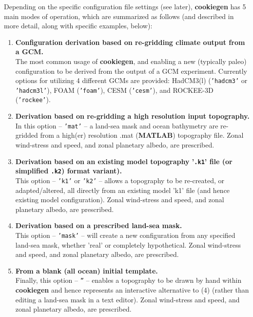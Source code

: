 Depending on the specific configuration file settings (see later), \textbf{cookiegen} has 5 main modes of operation, which are summarized as follows (and described in more detail, along with specific examples, below):

\begin{enumerate}[noitemsep]
\setlength{\itemindent}{.2in}
\setcounter{enumi}{0}
\vspace{1mm}
\item \textbf{Configuration derivation based on re-gridding climate output from a GCM.}
\\ The most common usage of \textbf{cookiegen}, and enabling a new (typically paleo) configuration to be derived from the output of a GCM experiment. Currently options for utilizing 4 different GCMs are provided: HadCM3(l) (\texttt{'hadcm3'} or \texttt{'hadcm3l'}), FOAM (\texttt{'foam'}), CESM (\texttt{'cesm'}), and ROCKEE-3D (\texttt{'rockee'}).
\vspace{1mm}
\item \textbf{Derivation based on re-gridding a high resolution input topography.}
\\ In this option -- \texttt{'mat'} -- a land-sea mask and ocean bathymetry are re-gridded from a high(er) resolution \textsf{\footnotesize .mat} (\textbf{MATLAB}) topography file. Zonal wind-stress and speed, and zonal planetary albedo, are prescribed.
\vspace{1mm}
\item \textbf{Derivation based on an existing model topography '\texttt{.k1}' file (or simplified \texttt{.k2}) format variant).}
\\ This option -- \texttt{'k1'} or \texttt{'k2'} -- allows a topography to be re-created, or adapted/altered, all directly from an existing model 'k1' file (and hence existing model configuration). Zonal wind-stress and speed, and zonal planetary albedo, are prescribed.
\vspace{1mm}
\item \textbf{Derivation based on a prescribed land-sea mask.}
\\ This option -- \texttt{'mask'} -- will create a new configuration from any specified land-sea mask, whether 'real' or completely hypothetical. Zonal wind-stress and speed, and zonal planetary albedo, are prescribed.
\vspace{1mm}
\item \textbf{From a blank (all ocean) initial template.}
\\ Finally, this option -- \texttt{''} -- enables a topography to be drawn by hand within \textbf{cookiegen} and hence represents an interactive alternative to (4) (rather than editing a land-sea mask in a text editor). Zonal wind-stress and speed, and zonal planetary albedo, are prescribed.
\end{enumerate}

